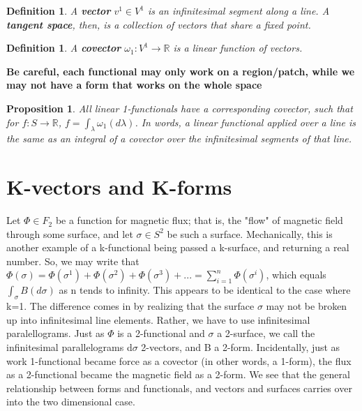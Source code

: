 \documentclass{book}
\newtheorem{defn}[equation]{Definition}
\newtheorem{prop}[equation]{Proposition}
\begin{document}
\begin{defn}
	A \textbf{vector} $v^1 \in V^1$ is an infinitesimal segment along a line. A \textbf{tangent space}, then, is a collection of vectors that share a fixed point. 
\end{defn}


\begin{defn}
	A \textbf{covector} $\omega_1 : V^1 \to \mathbb{R}$ is a linear function of vectors. 
\end{defn}




\textbf{Be careful, each functional may only work on a region/patch, while we may not have a form that works on the whole space}
\begin{prop}
	All linear 1-functionals have a corresponding covector, such that for $f : S \to \mathbb{R}$, $f = \int_{\lambda} \omega_1(d\lambda)$. In words, a linear functional applied over a line is the same as an integral of a covector over the infinitesimal segments of that line. 
\end{prop}




\section{K-vectors and K-forms}

Let $\Phi \in F_2$ be a function for magnetic flux; that is, the "flow" of magnetic field through some surface, and let $\sigma \in S^2$ be such a surface. Mechanically, this is another example of a k-functional being passed a k-surface, and returning a real number. So, we may write that $\Phi(\sigma) = \Phi(\sigma^1) + \Phi(\sigma^2) + \Phi(\sigma^3) + ... = \sum_{i=1}^n \Phi(\sigma^i)$, which equals $\int_\sigma B(d\sigma)$ as n tends to infinity. This appears to be identical to the case where k=1. The difference comes in by realizing that the surface $\sigma$ may not be broken up into infinitesimal line elements. Rather, we have to use infinitesimal paralellograms. Just as $\Phi$ is a 2-functional and $\sigma$ a 2-surface, we call the infinitesimal parallelograms d$\sigma$ 2-vectors, and B a 2-form. Incidentally, just as work 1-functional became force as a covector (in other words, a 1-form), the flux as a 2-functional became the magnetic field as a 2-form. We see that the general relationship between forms and functionals, and vectors and surfaces carries over into the two dimensional case. 
\end{document}
